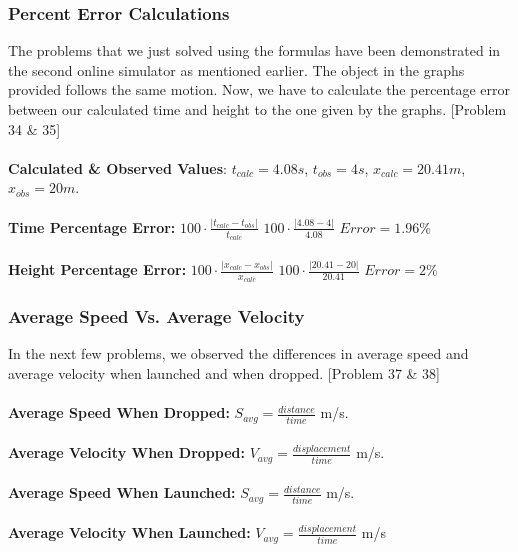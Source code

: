 \documentclass{article}
\begin{document}
\subsubsection{Percent Error Calculations} 
The problems that we just solved using the formulas have been demonstrated in the second online simulator as mentioned earlier. The object in the graphs provided follows the same motion. Now, we have to calculate the percentage error between our calculated time and height to the one given by the graphs. [Problem 34 \& 35] \\ \\ 
\textbf{Calculated \& Observed Values}: \(t_{calc} = 4.08s\), \(t_{obs} = 4s\), \(x_{calc} = 20.41m\), \(x_{obs} = 20m\). \\\\
\textbf{Time Percentage Error:} \(100 \cdot \frac{|t_{calc} - t_{obs}|}{t_{calc}}\) \Rightarrow \(100 \cdot \frac{|4.08-4|}{4.08}\) \Rightarrow \(Error= 1.96\%\) \\\\
\textbf{Height Percentage Error:} \(100 \cdot \frac{|x_{calc} - x_{obs}|}{x_{calc}}\) \Rightarrow \(100 \cdot \frac{|20.41-20|}{20.41}\) \Rightarrow \(Error= 2\%\) 

\subsubsection{Average Speed Vs. Average Velocity}
In the next few problems, we observed the differences in average speed and average velocity when launched and when dropped. [Problem 37 \& 38] \\ \\ 
\textbf{Average Speed When Dropped: } \(S_{avg} = \frac{distance}{time}\) \Rightarrow {} \si[per-mode=symbol]{\meter\per\second}. \\ \\
\textbf{Average Velocity When Dropped: } \(V_{avg} = \frac{displacement}{time}\) \Rightarrow {} \si[per-mode=symbol]{\meter\per\second}. \\ \\
\textbf{Average Speed When Launched: } \(S_{avg} = \frac{distance}{time}\) \Rightarrow {} \si[per-mode=symbol]{\meter\per\second}. \\ \\
\textbf{Average Velocity When Launched: } \(V_{avg} = \frac{displacement}{time}\) \Rightarrow {} \si[per-mode=symbol]{\meter\per\second}
\end{document}

